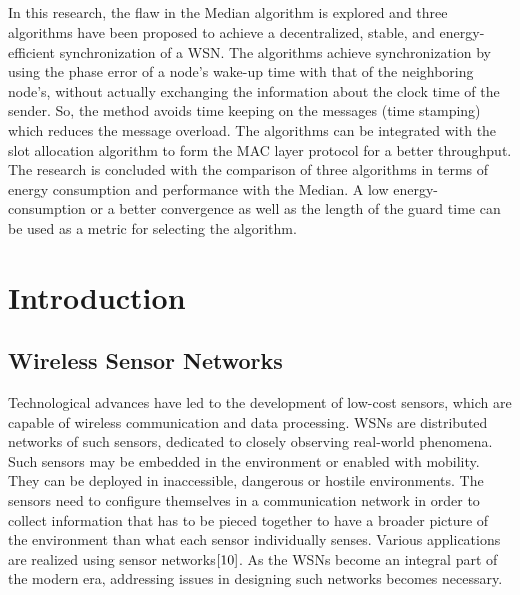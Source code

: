 \documentclass[a4paper,10pt]{report}
\begin{document}
\paragraph*{}
In this research, the flaw in the Median algorithm is explored and three algorithms have been proposed to achieve a decentralized, stable, and energy-efficient synchronization of a WSN. The algorithms achieve synchronization by using the phase error of a node's wake-up time with that of the neighboring node's, without actually exchanging the information about the clock time of the sender. So, the method avoids time keeping on the messages (time stamping) which reduces the message overload. The algorithms can be integrated with the slot allocation algorithm to form the MAC layer protocol for a better throughput. The research is concluded with the comparison of three algorithms in terms of energy consumption and performance with the Median. A low energy-consumption or a better convergence as well as the length of the guard time can be used as a metric for selecting the algorithm.
\tableofcontents
\listoffigures
\printnomenclature[3.5cm]
\chapter{\textbf{Introduction}}
\section{\textbf{Wireless Sensor Networks}}\par
Technological advances have led to the development of low-cost sensors, which are capable of wireless communication and
data processing. WSNs are distributed networks of such sensors, dedicated to closely observing
real-world phenomena. Such sensors may be embedded in the environment or enabled with mobility. They can be deployed in
inaccessible, dangerous or hostile environments. The sensors need to configure themselves in a communication network in order to collect
information that has to be pieced together to have a broader picture of the environment than what each sensor individually
senses. Various applications are realized using sensor networks$\cite{10}$. As the WSNs become an integral part of the modern era, addressing issues in designing such networks becomes necessary.
\end{document}
